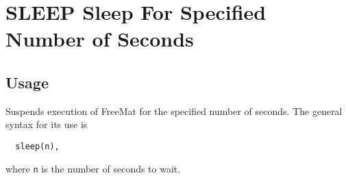 \section{SLEEP Sleep For Specified Number of Seconds}

\subsection{Usage}

Suspends execution of FreeMat for the specified number
of seconds.  The general syntax for its use is
\begin{verbatim}
  sleep(n),
\end{verbatim}
where \verb|n| is the number of seconds to wait.
